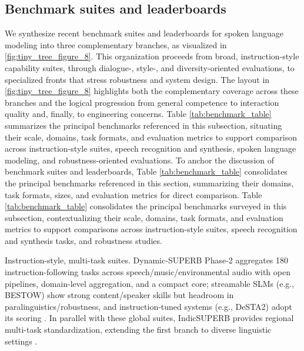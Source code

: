 \documentclass{article}
\begin{document}
\subsection{Benchmark suites and leaderboards} \label{subsec:Benchmark suites and leaderboards}







We synthesize recent benchmark suites and leaderboards for spoken language modeling into three complementary branches, as visualized in \autoref{fig:tiny_tree_figure_8}. This organization proceeds from broad, instruction-style capability suites, through dialogue-, style-, and diversity-oriented evaluations, to specialized fronts that stress robustness and system design. The layout in \autoref{fig:tiny_tree_figure_8} highlights both the complementary coverage across these branches and the logical progression from general competence to interaction quality and, finally, to engineering concerns. Table \ref{tab:benchmark_table} summarizes the principal benchmarks referenced in this subsection, situating their scale, domains, task formats, and evaluation metrics to support comparison across instruction-style suites, speech recognition and synthesis, spoken language modeling, and robustness-oriented evaluations. To anchor the discussion of benchmark suites and leaderboards, Table \ref{tab:benchmark_table} consolidates the principal benchmarks referenced in this section, summarizing their domains, task formats, sizes, and evaluation metrics for direct comparison. Table \ref{tab:benchmark_table} consolidates the principal benchmarks surveyed in this subsection, contextualizing their scale, domains, task formats, and evaluation metrics to support comparisons across instruction-style suites, speech recognition and synthesis tasks, and robustness studies.

Instruction-style, multi-task suites. Dynamic‑SUPERB Phase‑2 aggregates 180 instruction-following tasks across speech/music/environmental audio with open pipelines, domain-level aggregation, and a compact core; streamable SLMs (e.g., BESTOW) show strong content/speaker skills but headroom in paralinguistics/robustness, and instruction-tuned systems (e.g., DeSTA2) adopt its scoring \cite{huang2025dynamicsuperbphase2collaborativelyexpand,chen2024bestowefficientstreamablespeechlanguagem,lu2025desta2developinginstructionfollowingspee}. In parallel with these global suites, IndicSUPERB provides regional multi-task standardization, extending the first branch to diverse linguistic settings \cite{entry2025indicsuperbspeechprocessinguniversalperf}.
\end{document}
